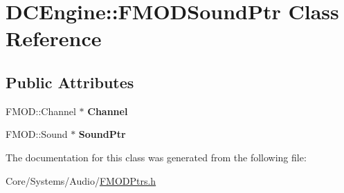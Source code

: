 \hypertarget{classDCEngine_1_1FMODSoundPtr}{\section{D\-C\-Engine\-:\-:F\-M\-O\-D\-Sound\-Ptr Class Reference}
\label{classDCEngine_1_1FMODSoundPtr}
}
\subsection*{Public Attributes}
\begin{DoxyCompactItemize}
\item 
\hypertarget{classDCEngine_1_1FMODSoundPtr_a14257f2ebdb4e564a73a23d47b1c257d}{F\-M\-O\-D\-::\-Channel $\ast$ {\bfseries Channel}}\label{classDCEngine_1_1FMODSoundPtr_a14257f2ebdb4e564a73a23d47b1c257d}

\item 
\hypertarget{classDCEngine_1_1FMODSoundPtr_a0928c41200dd802e9c31e345551781a5}{F\-M\-O\-D\-::\-Sound $\ast$ {\bfseries Sound\-Ptr}}\label{classDCEngine_1_1FMODSoundPtr_a0928c41200dd802e9c31e345551781a5}

\end{DoxyCompactItemize}


The documentation for this class was generated from the following file\-:\begin{DoxyCompactItemize}
\item 
Core/\-Systems/\-Audio/\hyperlink{FMODPtrs_8h}{F\-M\-O\-D\-Ptrs.\-h}\end{DoxyCompactItemize}
